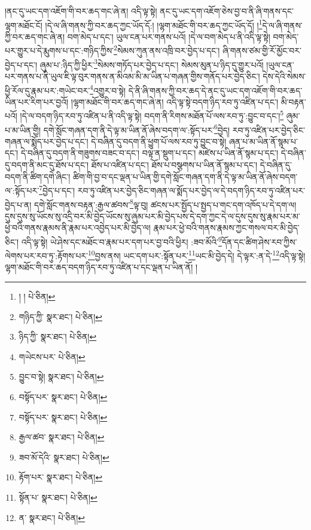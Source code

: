 །ནང་དུ་ཡང་དག་འཇོག་གི་བར་ཆད་གང་ཞེ་ན། འདི་ལྟ་སྟེ། ནང་དུ་ཡང་དག་འཇོག་ཅེས་བྱ་བ་ནི་ཞི་གནས་དང་ལྷག་མཐོང་ངོ། །དེ་ལ་ཞི་གནས་ཀྱི་བར་ཆད་ཀྱང་ཡོད་དོ:། །ལྷག་མཐོང་གི་བར་ཆད་ཀྱང་ཡོད་དོ། །\footnote{། །  པེ་ཅིན། }དེ་ལ་ཞི་གནས་ཀྱི་བར་ཆད་གང་ཞེ་ན། བག་མེད་པ་དང་། ཡུལ་ངན་པར་གནས་པའོ། །དེ་ལ་བག་མེད་པ་ནི་འདི་ལྟ་སྟེ། བག་མེད་པར་གྱུར་པ་དེ་རྨུགས་པ་དང་:གཉིད་ཀྱིས་\footnote{གཉིད་ཀྱི་  སྣར་ཐང་།  པེ་ཅིན། }སེམས་ཀུན་ནས་འཁྲི་བར་བྱེད་པ་དང་། ཞི་གནས་ཙམ་གྱི་རོ་མྱོང་བར་བྱེད་པ་དང་། ཞུམ་པ་:ཉིད་ཀྱི་ཕྱིར་\footnote{ཉིད་ཀྱི་  སྣར་ཐང་།  པེ་ཅིན། }སེམས་གཏོད་པར་བྱེད་པ་དང་། སེམས་མུན་པ་ཉིད་དུ་གྱུར་པའོ། །ཡུལ་ངན་པར་གནས་པ་ནི་ཡུལ་ཇི་ལྟ་བུར་གནས་ན་མིའམ་མི་མ་ཡིན་པ་གཞན་གྱིས་གནོད་པར་བྱེད་ཅིང་། དེས་དེའི་སེམས་ཕྱི་རོལ་དུ་རྣམ་པར་:གཡེང་བར་\footnote{གཡེངས་པར་  པེ་ཅིན། }འགྱུར་བ་སྟེ། དེ་ནི་ཞི་གནས་ཀྱི་བར་ཆད་དེ་ནང་དུ་ཡང་དག་འཇོག་གི་བར་ཆད་ཡིན་པར་རིག་པར་བྱའོ། །ལྷག་མཐོང་གི་བར་ཆད་གང་ཞེ་ན། འདི་ལྟ་སྟེ་བདག་ཉིད་རབ་ཏུ་འཛིན་པ་དང་། མི་བརྟན་པའོ། །དེ་ལ་བདག་ཉིད་རབ་ཏུ་འཛིན་པ་ནི་འདི་ལྟ་སྟེ། བདག་ནི་རིགས་མཐོན་པོ་ལས་རབ་ཏུ་:བྱུང་བ་དང་།\footnote{བྱུང་བ་སྟེ།  སྣར་ཐང་།  པེ་ཅིན། } ཞུམ་པ་མ་ཡིན་གྱི། དགེ་སློང་གཞན་དག་ནི་དེ་ལྟ་མ་ཡིན་ནོ་ཞེས་བདག་ལ་:སྟོད་པར་\footnote{བསྟོད་པར་  སྣར་ཐང་།  པེ་ཅིན། }བྱེད། རབ་ཏུ་འཛིན་པར་བྱེད་ཅིང་གཞན་ལ་སྨོད་པར་བྱེད་པ་དང་། དེ་བཞིན་དུ་བདག་ནི་ཕྱུག་པོ་ལས་རབ་ཏུ་བྱུང་བ་སྟེ། ཞན་པ་མ་ཡིན་ནོ་སྙམ་པ་དང་། དེ་བཞིན་དུ་བདག་ནི་གཟུགས་བཟང་བ་དང་། བལྟ་ན་སྡུག་པ་དང་། མཛེས་པ་ཡིན་ནོ་སྙམ་པ་དང་། དེ་བཞིན་དུ་བདག་ནི་མང་དུ་ཐོས་པ་དང་། ཐོས་པ་འཛིན་པ་དང་། ཐོས་པ་བསྩགས་པ་ཡིན་ནོ་སྙམ་པ་དང་། དེ་བཞིན་དུ་བདག་ནི་ཚིག་དགེ་ཞིང་། ཚིག་གི་བྱ་བ་དང་ལྡན་པ་ཡིན་གྱི་དགེ་སློང་གཞན་དག་ནི་དེ་ལྟ་མ་ཡིན་ནོ་ཞེས་བདག་ལ་:སྟོད་པར་\footnote{བསྟོད་པར་  སྣར་ཐང་།  པེ་ཅིན། }བྱེད་པ་དང་། རབ་ཏུ་འཛིན་པར་བྱེད་ཅིང་གཞན་ལ་སྨོད་པར་བྱེད་ལ་དེ་བདག་ཉིད་རབ་ཏུ་འཛིན་པར་བྱེད་པ་ན། དགེ་སློང་གནས་བརྟན་:རྒྱལ་ཚབས་\footnote{རྒྱལ་ཚབ་  སྣར་ཐང་།  པེ་ཅིན། }ལྟ་བུ། ཚངས་པར་སྤྱོད་པ་སྤྱད་པ་གང་དག་འཁོད་པ་དེ་དག་ལ། དུས་དུས་སུ་ཡོངས་སུ་འདྲི་བར་མི་བྱེད་ཡོངས་སུ་ཞུམ་པར་མི་བྱེད་པས་དེ་དག་ཀྱང་དེ་ལ་དུས་དུས་སུ་རྣམ་པར་མ་ཕྱེ་བའི་གནས་རྣམས་ནི་རྣམ་པར་འབྱེད་པར་མི་བྱེད་ལ། རྣམ་པར་ཕྱེ་བའི་གནས་རྣམས་ཀྱང་གསལ་བར་མི་བྱེད་ཅིང་། འདི་ལྟ་སྟེ། ཡེ་ཤེས་དང་མཐོང་བ་རྣམ་པར་དག་པར་བྱ་བའི་ཕྱིར། :ཟབ་མོའི་\footnote{ཟབ་མོ་དེའི་  སྣར་ཐང་།  པེ་ཅིན། }དོན་དང་ཚིག་ཤེས་རབ་ཀྱིས་ལེགས་པར་རབ་ཏུ་:རྟོགས་པར་\footnote{རྟོག་པར་  སྣར་ཐང་།  པེ་ཅིན། }བྱས་ནས། ཡང་དག་པར་:སྟོན་པར་\footnote{སྟོན་པ་  སྣར་ཐང་།  པེ་ཅིན། }ཡང་མི་བྱེད་དེ། དེ་ལྟར་:ན་དེ་\footnote{ན་  སྣར་ཐང་།  པེ་ཅིན། }འདི་ལྟ་སྟེ། ལྷག་མཐོང་གི་བར་ཆད་བདག་ཉིད་རབ་ཏུ་འཛིན་པ་དང་ལྡན་པ་ཡིན་ནོ། །
